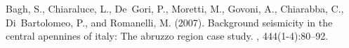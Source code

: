 \documentclass[a4paper,12pt]{article}
\begin{document}
\FloatBarrier

\begin{thebibliography}{}

Bagh, S., Chiaraluce, L., De~Gori, P., Moretti, M., Govoni, A., Chiarabba, C.,
  Di~Bartolomeo, P., and Romanelli, M. (2007).
\newblock Background seismicity in the central apennines of italy: The abruzzo
  region case study.
, 444(1-4):80--92.

\end{thebibliography}{}
\end{document}

